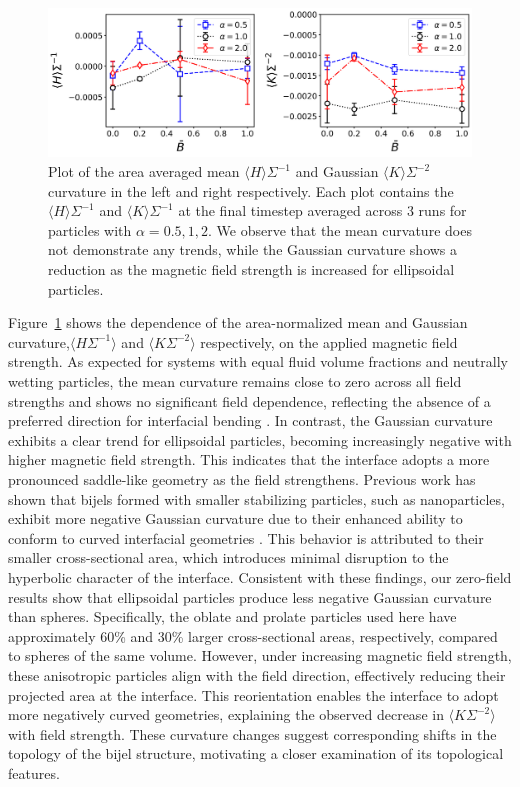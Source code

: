 \begin{figure}
    \centering
\includegraphics[scale=0.5]{../figures/results/paper1_5/curvature_field.png}%
\caption{Plot of the area averaged mean $\langle H \rangle \Sigma^{-1}$ and Gaussian $\langle K \rangle \Sigma^{-2}$ curvature in the left and right 
         respectively. Each plot contains the $\langle H \rangle \Sigma^{-1}$ and $\langle K \rangle \Sigma^{-1}$ at the final timestep averaged across 
         3 runs for particles with $\alpha = 0.5, 1, 2$. We observe that the mean curvature does not demonstrate any trends, while the Gaussian curvature 
         shows a reduction as the magnetic field strength is increased for ellipsoidal particles.}
\label{fig:curvature_field}%
\end{figure}

Figure~\ref{fig:curvature_field} shows the dependence of the area-normalized mean and Gaussian curvature,\(\langle H \Sigma^{-1} \rangle\) and \(\langle K \Sigma^{-2} \rangle\) respectively, on the 
applied magnetic field strength. As expected for systems with equal fluid volume fractions and neutrally wetting particles, the mean curvature remains close to zero across all field strengths and shows 
no significant field dependence, reflecting the absence of a preferred direction for interfacial bending \cite{jinnai_interfacial_2001}. In contrast, the Gaussian curvature exhibits a clear trend for 
ellipsoidal particles, becoming increasingly negative with higher magnetic field strength. This indicates that the interface adopts a more pronounced saddle-like geometry as the field strengthens.
Previous work has shown that bijels formed with smaller stabilizing particles, such as nanoparticles, exhibit more negative Gaussian curvature due to their enhanced ability to conform to curved interfacial 
geometries \cite{reeves_quantitative_2016}. This behavior is attributed to their smaller cross-sectional area, which introduces minimal disruption to the hyperbolic character of the interface. Consistent 
with these findings, our zero-field results show that ellipsoidal particles produce less negative Gaussian curvature than spheres. Specifically, the oblate and prolate particles used here have approximately 
60\% and 30\% larger cross-sectional areas, respectively, compared to spheres of the same volume. However, under increasing magnetic field strength, these anisotropic particles align with the field direction, 
effectively reducing their projected area at the interface. This reorientation enables the interface to adopt more negatively curved geometries, explaining the observed decrease in 
\(\langle K \Sigma^{-2} \rangle\) with field strength. These curvature changes suggest corresponding shifts in the topology of the bijel structure, motivating a closer examination of its topological features.


